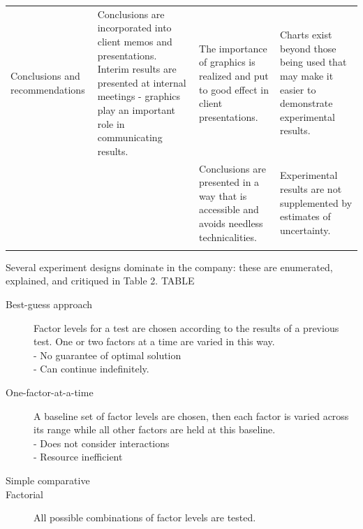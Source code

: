 \documentclass[11pt,a4paper,article]{memoir} %
\begin{document}
\begin{landscape}
{\begin{longtable}{p{4cm} p{7cm} p{6cm} p{6cm}}
\cmidrule{1-4}
Conclusions and recommendations & Conclusions are incorporated into client memos and presentations. Interim results are presented at internal meetings - graphics play an important role in communicating results. & The importance of graphics is realized and put to good effect in client presentations. & Charts exist beyond those being used that may make it easier to demonstrate experimental results. \\ 
 &  & Conclusions are presented in a way that is accessible and avoids needless technicalities. & Experimental results are not supplemented by estimates of uncertainty. \\ 
\bottomrule
\label{tab:exp_procedure}
\end{longtable}
}
\end{landscape}


\par
Several experiment designs dominate in the company: these are enumerated, explained, and critiqued in Table 2.
TABLE
\begin{description}
\item[Best-guess approach]{Factor levels for a test are chosen according to the results of a previous test. One or two factors at a time are varied in this way. \\ - No guarantee of optimal solution \\ - Can continue indefinitely.}
\item[One-factor-at-a-time]{A baseline set of factor levels are chosen, then each factor is varied across its range while all other factors are held at this baseline.\\ - Does not consider interactions \\ - Resource inefficient}
\item[Simple comparative]{}
\item[Factorial]{All possible combinations of factor levels are tested.}
\end{description}
\end{document}
